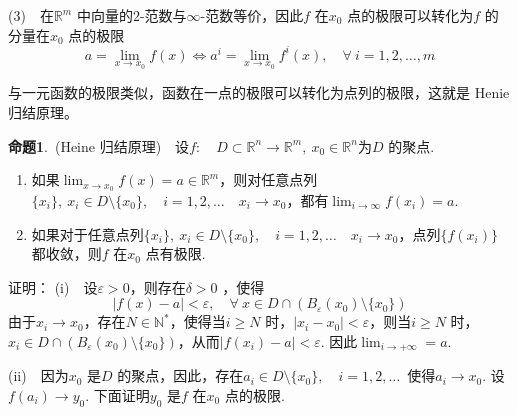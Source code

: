 \documentclass{article}
\begin{document}
\vspace{10pt}

(3)\ \ 在\(\mathbb{R}^{m}\) 中向量的\(2\)-范数与\(\infty \)-范数等价，因此\(f\) 在\(x_0\) 点的极限可以转化为\(f\) 的分量在\(x_0\) 点的极限
\begin{equation*}
    a = \lim_{x \to x_0}f(x) \iff a^i = \lim_{x \to x_0}f^i(x),\quad \forall\ i = 1,2,\dots ,m
\end{equation*}

\newpage

与一元函数的极限类似，函数在一点的极限可以转化为点列的极限，这就是 Henie 归结原理。

\vspace{10pt}

\textbf{命题1}.\ (Heine 归结原理)\ \ 设\(f:\quad D \subset \mathbb{R}^n\to \mathbb{R}^{m},\ x_0 \in \mathbb{R}^n\)为\(D\) 的聚点.
\begin{enumerate}
    \item 如果\(\lim_{x \to x_0}f(x) = a \in \mathbb{R}^{m} \)，则对任意点列\(\{x_i\},\ x_i \in D\setminus \{x_0\},\quad i = 1,2,\dots \quad x_i \to x_0 \)，都有\(\lim_{i \to \infty }f(x_i) = a \).
    \item 如果对于任意点列\(\{x_i\},\ x_i \in D\setminus \{x_0\},\quad i = 1,2,\dots \quad x_i \to x_0  \)，点列\(\{f(x_i)\} \) 都收敛，则\(f\) 在\(x_0\) 点有极限.
\end{enumerate}

\vspace{10pt}

证明：
(i)\ \ 设\(\varepsilon > 0\)，则存在\(\delta > 0\) ，使得
\begin{equation*}
    | f(x) - a | < \varepsilon ,\quad \forall\ x \in D \cap (B_{\varepsilon }(x_0)\setminus \{x_0\} )
\end{equation*}
由于\(x_i \to x_0\)，存在\(N \in \mathbb{N}^{*}\)，使得当\(i \ge N\) 时，\(| x_i - x_0 |< \varepsilon  \)，则当\(i \ge N\) 时，\(x_i \in D \cap \left( B_{\varepsilon }(x_0)\setminus \{x_0\}  \right) \)，从而\(| f(x_i) - a |< \varepsilon  \). 因此\(\lim_{i \to + \infty } = a \).

\vspace{10pt}

(ii)\ \ 因为\(x_0\) 是\(D\) 的聚点，因此，存在\(a_i \in D\setminus \{x_0\},\quad i = 1,2,\dots  \)\ 使得\(a_i \to x_0\).  设\(f(a_i) \to y_0\). 下面证明\(y_0\) 是\(f\) 在\(x_0\) 点的极限.

\vspace{10pt}
\end{document}
